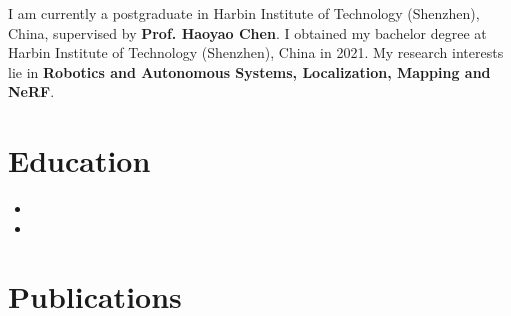 \documentclass[11pt,a4paper,sans]{moderncv}        %
\begin{document}

\makecvtitle

\small{I am currently a postgraduate in Harbin Institute of Technology (Shenzhen), China, supervised by \textbf{Prof. Haoyao Chen}. I obtained my bachelor degree at Harbin Institute of Technology (Shenzhen), China in 2021. 
My research interests lie in \textbf{Robotics and Autonomous Systems, Localization, Mapping and NeRF}.
} 

\section{Education}


\begin{itemize}

\item{}

\item{}

\end{itemize}



\section{Publications}
\end{document}
